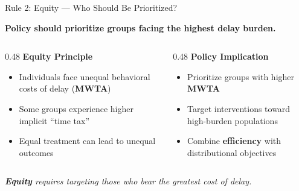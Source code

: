 \begin{frame}{Rule 2: Equity --- Who Should Be Prioritized?}
    \begin{center}
        \textbf{Policy should prioritize groups facing the highest \textbf{delay burden}.}
    \end{center}

    \vspace{2em}

    \begin{columns}[T]
        \begin{column}{0.48\textwidth}
            \textbf{Equity Principle}
            \begin{itemize}
                \item Individuals face unequal behavioral costs of delay (\textbf{MWTA})
                \item Some groups experience higher implicit ``time tax''
                \item Equal treatment can lead to unequal outcomes
            \end{itemize}
        \end{column}
        
        \hfill
        
        \begin{column}{0.48\textwidth}
            \textbf{Policy Implication}
            \begin{itemize}
                \item Prioritize groups with higher \textbf{MWTA}
                \item Target interventions toward high-burden populations
                \item Combine \textbf{efficiency} with distributional objectives
            \end{itemize}
        \end{column}
    \end{columns}
    
    \vfill
    \begin{center}
        \textit{\textbf{Equity} requires targeting those who bear the greatest cost of delay.}
    \end{center}
\end{frame}
